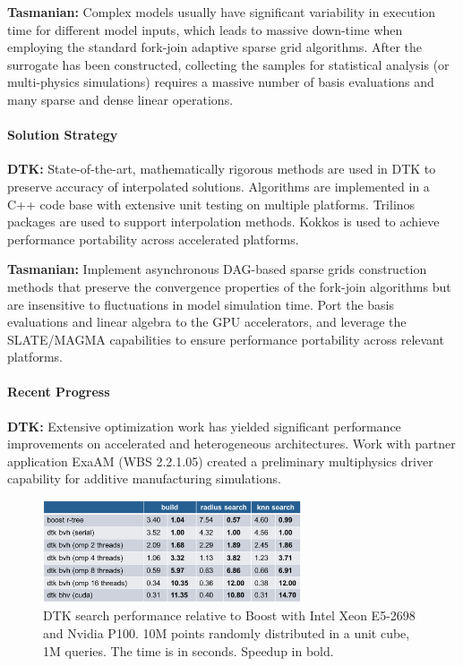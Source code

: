 {\bf Tasmanian:} Complex models usually have significant variability in
execution time for different model inputs, which leads to massive down-time
when employing the standard fork-join adaptive sparse grid algorithms.  After
the surrogate has been constructed, collecting the samples for statistical
analysis (or multi-physics simulations) requires a massive number of basis
evaluations and many sparse and dense linear operations.

\paragraph{Solution Strategy}

\nobreak


\indent

{\bf DTK:} State-of-the-art, mathematically rigorous methods are used in DTK
to preserve accuracy of interpolated solutions.  Algorithms are implemented in
a C++ code base with extensive unit testing on multiple platforms.  Trilinos
packages are used to support interpolation methods.  Kokkos is used to achieve
performance portability across accelerated platforms.

{\bf Tasmanian:} Implement asynchronous DAG-based sparse grids construction
methods that preserve the convergence properties of the fork-join algorithms
but are insensitive to fluctuations in model simulation time.  Port the basis
evaluations and linear algebra to the GPU accelerators, and leverage the
SLATE/MAGMA capabilities to ensure performance portability across relevant
platforms.



\paragraph{Recent Progress}

\indent

{\bf DTK:} Extensive optimization work has yielded significant performance
improvements on accelerated and heterogeneous architectures. Work with partner
application ExaAM (WBS 2.2.1.05) created a preliminary multiphysics driver
capability for additive manufacturing simulations.

\begin{figure}[htb]
        \centering
        \includegraphics[width=3.0in]{projects/2.3.3-MathLibs/2.3.3.14-ALExa-ForTrilinos/dtk-gpu}
        \caption{\label{fig:dtk-gpu}DTK search performance relative to Boost with Intel Xeon E5-2698 and Nvidia P100. 10M points randomly distributed in a unit cube, 1M queries. The time is in seconds. Speedup in bold.}
\end{figure}

